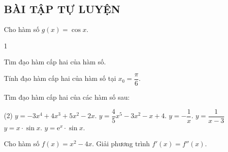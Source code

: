 \subsection{BÀI TẬP TỰ LUYỆN}

\begin{baitap}%
	Cho hàm số $g(x)=\cos x$.
	\begin{enumEX}{1}
		\item Tìm đạo hàm cấp hai của hàm số.
		\item Tính đạo hàm cấp hai của hàm số tại $x_0=\dfrac{\pi}{6}$.
	\end{enumEX}
\end{baitap}

\begin{baitap}%
	Tìm đạo hàm cấp hai của các hàm số sau:
	\begin{tasks}(2)
		\task $y=-3x^4+4x^3+5x^2-2x$.
		\task $y=\dfrac{4}{5}x^5-3x^2-x+4$. 
		\task $y=-\dfrac{1}{x}$.
		\task $y=\dfrac{1}{x-3}$
		\task $y=x\cdot\sin x$.
		\task $y=\mathrm{e}^x\cdot\sin x$.
	\end{tasks}
\end{baitap}


\begin{baitap}%
	Cho hàm số $f(x)=x^2-4 x$. Giải phương trình $f'(x)=f''(x)$.
\end{baitap}

